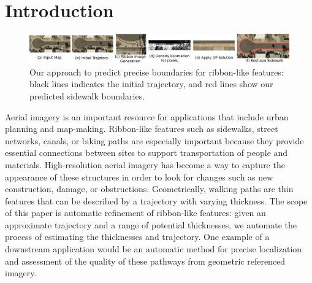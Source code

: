 \section{Introduction}

\begin{figure}[tb!]
\begin{center}
\includegraphics[width=\textwidth]{Figures/diagram.pdf}
\caption[Framework Overview]{Our approach to predict precise boundaries for ribbon-like features: black lines indicates the initial trajectory, and red lines show our predicted sidewalk boundaries.}
\label{fig:Apparatus}
\end{center}
\end{figure}


Aerial imagery is an important resource for applications that include urban planning and map-making. 
Ribbon-like features such as sidewalks, street networks, canals, or biking paths are especially important because they provide essential connections between sites to support transportation of people and materials.
High-resolution aerial imagery has become a way to capture the appearance of these structures in order to look for changes such as new construction, damage, or obstructions. 
Geometrically, walking paths are thin features that can be described by a trajectory with varying thickness.
The scope of this paper is automatic refinement of ribbon-like features: given an approximate trajectory and a range of potential thicknesses, we automate the process of estimating the thicknesses and  trajectory. 
One example of a downstream application would be an automatic method for precise localization and assessment of the quality of these pathways from geometric referenced imagery. 

